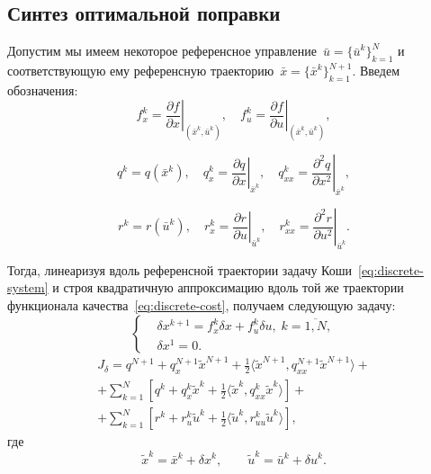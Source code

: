 \documentclass[../../doc.tex]{subfiles}
\begin{document}
    \subsection{Синтез оптимальной поправки}
    
    Допустим мы имеем некоторое референсное управление~$\bar u=\{\bar u^k\}_{k=1}^{N}$ и соответствующую ему референсную траекторию~$\bar x=\{\bar x^k\}_{k=1}^{N+1}$.
    Введем обозначения:
    $$
        f_x^k = \left.\frac{\partial f}{\partial x}\right|_{(\bar x^k, \bar u^k)},
        \quad
        f_u^k = \left.\frac{\partial f}{\partial u}\right|_{(\bar x^k, \bar u^k)},
    $$

    $$
        q^k = q(\bar x^k),
        \quad
        q_x^k = \left.\frac{\partial q}{\partial x}\right|_{\bar x^k},
        \quad
        q_{xx}^k = \left.\frac{\partial^2 q}{\partial x^2}\right|_{\bar x^k},
    $$

    $$
        r^k = r(\bar u^k),
        \quad
        r_x^k = \left.\frac{\partial r}{\partial u}\right|_{\bar u^k},
        \quad
        r_{xx}^k = \left.\frac{\partial^2 r}{\partial u^2}\right|_{\bar u^k}.
    $$

    Тогда, линеаризуя вдоль референсной траектории задачу Коши~\eqref{eq:discrete-system} и строя квадратичную аппроксимацию вдоль той же траектории функционала качества~\eqref{eq:discrete-cost}, получаем следующую задачу:
    \begin{equation}\label{eq:ref-system}
        \left\{\begin{aligned}
            &\delta x^{k+1} = f_x^k \delta x + f_u^k \delta u, \; k=\overline{1,N}, \\
            &\delta x^1 = 0.
        \end{aligned}\right.
    \end{equation}
    \begin{multline}\label{eq:ref-cost}
        J_{\delta} = q^{N+1} + q_x^{N+1}\tilde x^{N+1} + \frac{1}{2}\langle \tilde x^{N+1}, q_{xx}^{N+1}\tilde x^{N+1} \rangle
        + \\ +
        \sum_{k=1}^{N}\left[ q^{k} + q_x^{k}\tilde x^{k} + \frac{1}{2}\langle \tilde x^{k}, q_{xx}^{k}\tilde x^{k} \rangle \right]
        + \\ +
        \sum_{k=1}^{N}\left[ r^{k} + r_u^{k}\tilde u^{k} + \frac{1}{2}\langle \tilde u^{k}, r_{uu}^{k}\tilde u^{k} \rangle \right],
    \end{multline}
    где
    \begin{equation*}
        \tilde x^k = \bar x^k + \delta x^k, \qquad \tilde u^k = \bar u^k + \delta u^k.
    \end{equation*}
\end{document}

